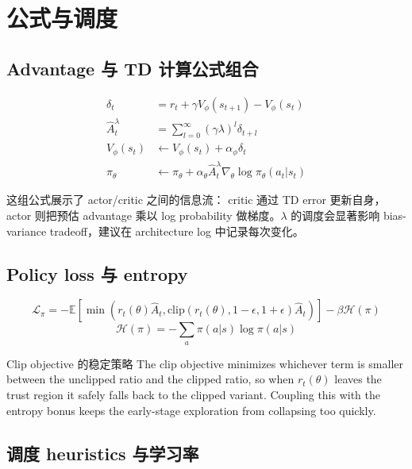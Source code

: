 \section{公式与调度}

\subsection{Advantage 与 TD 计算公式组合}

\begin{align*}
\delta_t &= r_t + \gamma V_{\phi}(s_{t+1}) - V_{\phi}(s_t) \\
\hat{A}_t^{\lambda} &= \sum_{l=0}^{\infty} (\gamma \lambda)^l \delta_{t+l} \\
V_{\phi}(s_t) &\leftarrow V_{\phi}(s_t) + \alpha_\phi \delta_t \\
\pi_\theta &\leftarrow \pi_\theta + \alpha_\theta \hat{A}_t^{\lambda} \nabla_\theta \log \pi_\theta(a_t|s_t)
\end{align*}

这组公式展示了 actor/critic 之间的信息流： critic 通过 TD error 更新自身，actor 则把预估 advantage 乘以 log probability 做梯度。$\lambda$ 的调度会显著影响 bias-variance tradeoff，建议在 architecture log 中记录每次变化。

\subsection{Policy loss 与 entropy}

\begin{equation*}
\mathcal{L}_\pi = -\mathbb{E} \left[ \min\left( r_t(\theta) \hat{A}_t, \text{clip}(r_t(\theta), 1-\epsilon, 1+\epsilon)\hat{A}_t \right) \right] - \beta \mathcal{H}(\pi)
\end{equation*}
\begin{equation*}
\mathcal{H}(\pi) = -\sum_a \pi(a|s) \log \pi(a|s)
\end{equation*}

\begin{knowledgebox}{Clip objective 的稳定策略}
The clip objective minimizes whichever term is smaller between the unclipped ratio and the clipped ratio, so when $r_t(\theta)$ leaves the trust region it safely falls back to the clipped variant. Coupling this with the entropy bonus keeps the early-stage exploration from collapsing too quickly.
\end{knowledgebox}

\subsection{调度 heuristics 与学习率}

